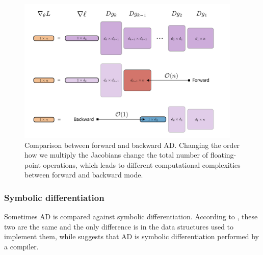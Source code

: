 \begin{figure}
    \centering
    \includegraphics[width=0.95\textwidth]{figures/VJP-JVP.png}
    \caption{Comparison between forward and backward AD. Changing the order how we multiply the Jacobians change the total number of floating-point operations, which leads to different computational complexities between forward and backward mode.}
    \label{fig:vjp-jvp}
\end{figure}

\subsubsection{Symbolic differentiation}

Sometimes AD is compared against symbolic differentiation.
According to \cite{Laue2020}, these two are the same and the only difference is in the data structures used to implement them, while \cite{Elliott_2018} suggests that AD is symbolic differentiation performed by a compiler.